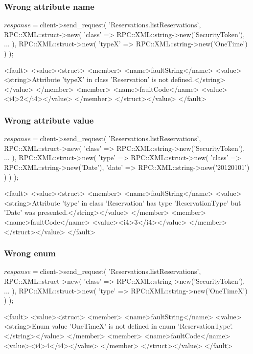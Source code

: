 \documentclass[a4paper]{report}
\begin{document}
\subsubsection{Wrong attribute name}
\begin{PerlCmd}
$response = $client->send_request(
    'Reservations.listReservations',
    RPC::XML::struct->new(
        'class' => RPC::XML::string->new('SecurityToken'),
        ...
    ),
    RPC::XML::struct->new(
        'typeX' => RPC::XML::string->new('OneTime')
    )
);
\end{PerlCmd}
\begin{PerlResponse}
<fault>
  <value><struct>
    <member>
      <name>faultString</name>
      <value><string>Attribute 'typeX' in class 'Reservation' is not defined.</string></value>
    </member>
    <member>
      <name>faultCode</name>
      <value><i4>2</i4></value>
    </member>
  </struct></value>
</fault>
\end{PerlResponse}

\subsubsection{Wrong attribute value}
\begin{PerlCmd}
$response = $client->send_request(
    'Reservations.listReservations',
    RPC::XML::struct->new(
        'class' => RPC::XML::string->new('SecurityToken'),
        ...
    ),
    RPC::XML::struct->new(
        'type' => RPC::XML::struct->new(
            'class' => RPC::XML::string->new('Date'),
            'date' => RPC::XML::string->new('20120101')
        )
    )
);
\end{PerlCmd}
\begin{PerlResponse}
<fault>
  <value><struct>
    <member>
      <name>faultString</name>
      <value><string>Attribute 'type' in class 'Reservation' has type 
          'ReservationType' but 'Date' was presented.</string></value>
    </member>
    <member>
      <name>faultCode</name>
      <value><i4>3</i4></value>
    </member>
  </struct></value>
</fault>
\end{PerlResponse}

\subsubsection{Wrong enum}
\begin{PerlCmd}
$response = $client->send_request(
    'Reservations.listReservations',
    RPC::XML::struct->new(
        'class' => RPC::XML::string->new('SecurityToken'),
        ...
    ),
    RPC::XML::struct->new(
        'type' => RPC::XML::string->new('OneTimeX')
    )
);
\end{PerlCmd}
\begin{PerlResponse}
<fault>
  <value><struct>
    <member>
      <name>faultString</name>
      <value><string>Enum value 'OneTimeX' is not defined in enum
          'ReservationType'.</string></value>
    </member>
    <member>
      <name>faultCode</name>
      <value><i4>4</i4></value>
    </member>
  </struct></value>
</fault>
\end{PerlResponse}
\end{document}

